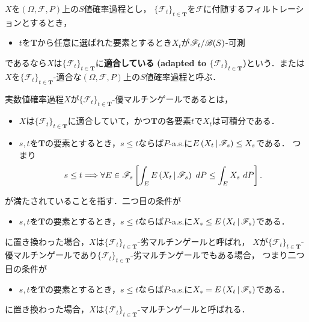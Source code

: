 	\begin{screen}
		\begin{dfn}[適合]
			$X$を$(\Omega,\mathscr{F},P)$上の$S$値確率過程とし，
			$\{\mathscr{F}_t\}_{t \in \mathbf{T}}$を$\mathscr{F}$に付随するフィルトレーションとするとき，
			\begin{itemize}
				\item $t$を$\mathbf{T}$から任意に選ばれた要素とするとき$X_t$が$\mathscr{F}_t/\mathscr{B}(S)$-可測
			\end{itemize}
			であるなら$X$は$\{\mathscr{F}_t\}_{t \in \mathbf{T}}$に{\bf 適合している}
			{\bf (adapted to $\{\mathscr{F}_t\}_{t \in \mathbf{T}}$)}という．または
			$X$を$\{\mathscr{F}_t\}_{t \in \mathbf{T}}$-適合な$(\Omega,\mathscr{F},P)$上の$S$値確率過程と呼ぶ．
		\end{dfn}
	\end{screen}
		
	実数値確率過程$X$が$\{\mathscr{F}_t\}_{t \in \mathbf{T}}$-優マルチンゲールであるとは，
	\begin{itemize}
		\item $X$は$\{\mathscr{F}_t\}_{t \in \mathbf{T}}$に適合していて，かつ$\mathbf{T}$の各要素$t$で$X_t$は可積分である．
		\item $s,t$を$\mathbf{T}$の要素とするとき，$s \leq t$ならば$P$-a.s.に$E\left( X_t \, \middle|\, \mathscr{F}_s \right) \leq X_s$である．
			つまり
			\begin{align}
				s \leq t \Longrightarrow 
				\forall E \in \mathscr{F}_s \left[ \int_E E\left( X_t \, \middle|\, \mathscr{F}_s \right)\ dP \leq \int_E X_s\ dP\right].
			\end{align}
	\end{itemize}
	が満たされていることを指す．二つ目の条件が
	\begin{itemize}
		\item $s,t$を$\mathbf{T}$の要素とするとき，$s \leq t$ならば$P$-a.s.に$X_s \leq E\left( X_t \, \middle|\, \mathscr{F}_s \right)$である．
	\end{itemize}
	に置き換わった場合，$X$は$\{\mathscr{F}_t\}_{t \in \mathbf{T}}$-劣マルチンゲールと呼ばれ，
	$X$が$\{\mathscr{F}_t\}_{t \in \mathbf{T}}$-優マルチンゲールであり$\{\mathscr{F}_t\}_{t \in \mathbf{T}}$-劣マルチンゲールでもある場合，
	つまり二つ目の条件が
	\begin{itemize}
		\item $s,t$を$\mathbf{T}$の要素とするとき，$s \leq t$ならば$P$-a.s.に$X_s = E\left( X_t \, \middle|\, \mathscr{F}_s \right)$である．
	\end{itemize}
	に置き換わった場合，$X$は$\{\mathscr{F}_t\}_{t \in \mathbf{T}}$-マルチンゲールと呼ばれる．
	
